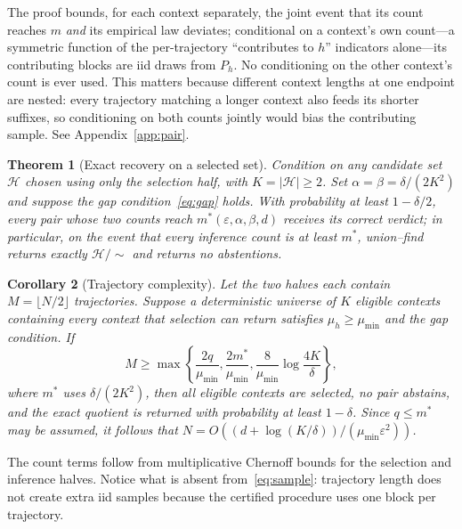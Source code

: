 \documentclass{article}
\newtheorem{theorem}{Theorem}
\newtheorem{corollary}[theorem]{Corollary}
\newcommand{\cH}{\mathcal H}
\newcommand{\eps}{\varepsilon}
\begin{document}
The proof bounds, for each context separately, the joint event that its
count reaches $m$ \emph{and} its empirical law deviates; conditional on a
context's own count---a symmetric function of the per-trajectory
``contributes to $h$'' indicators alone---its contributing blocks are iid
draws from $P_h$.  No conditioning on the other context's count is ever
used.  This matters because different context lengths at one endpoint are
nested: every trajectory matching a longer context also feeds its shorter
suffixes, so conditioning on both counts jointly would bias the contributing
sample.  See Appendix~\ref{app:pair}.

\begin{theorem}[Exact recovery on a selected set]        \label{thm:recovery}
Condition on any candidate set $\cH$ chosen using only the selection half,
with $K=|\cH|\ge2$.  Set
$\alpha=\beta=\delta/(2K^2)$ and suppose the gap condition~\eqref{eq:gap}
holds.  With probability at least $1-\delta/2$, every pair whose two counts
reach $m^*(\eps,\alpha,\beta,d)$ receives its correct verdict; in
particular, on the event that every inference count is at least $m^*$,
union--find returns exactly $\cH/{\sim}$ and returns no abstentions.
\end{theorem}

\begin{corollary}[Trajectory complexity]                 \label{cor:sample}
Let the two halves each contain $M=\lfloor N/2\rfloor$ trajectories.  Suppose
a deterministic universe of $K$ eligible contexts containing every context
that selection can return satisfies
$\mu_h\ge\mu_{\min}$ and the gap condition.  If
\begin{equation}
 M\ge \max\left\{
 \frac{2q}{\mu_{\min}},
 \frac{2m^*}{\mu_{\min}},
 \frac{8}{\mu_{\min}}\log\frac{4K}{\delta}
 \right\},                                             \label{eq:sample}
\end{equation}
where $m^*$ uses $\delta/(2K^2)$, then all eligible contexts are
selected, no pair abstains, and the exact quotient is returned with
probability at least $1-\delta$.  Since $q\le m^*$ may be assumed, it
follows that $N=O((d+\log(K/\delta))/(\mu_{\min}\eps^2))$.
\end{corollary}

The count terms follow from multiplicative Chernoff bounds for the selection
and inference halves.  Notice what is absent from~\eqref{eq:sample}: trajectory
length does not create extra iid samples because the certified procedure uses
one block per trajectory.
\end{document}
